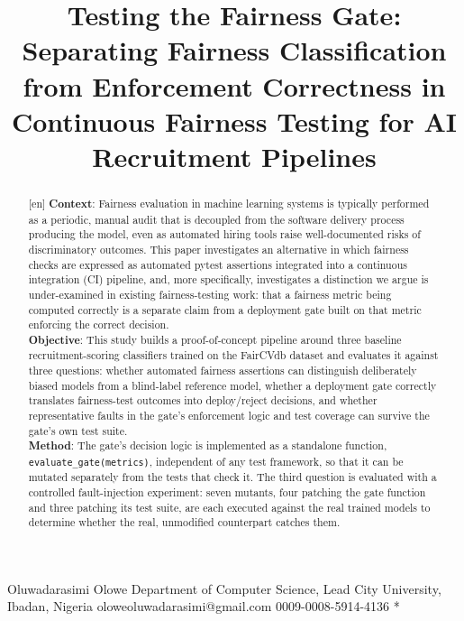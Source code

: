 \documentclass[]{einformatica}
\begin{document}
\title{Testing the Fairness Gate: Separating Fairness Classification from Enforcement Correctness in Continuous Fairness Testing for AI Recruitment Pipelines}



\eIrevised{}
\eIaccepted{}
\eIpublished{}

\EIauthorI
   {Oluwadarasimi}
   {Olowe}
   {Department of Computer Science, Lead City University, Ibadan, Nigeria}
   {oloweoluwadarasimi@gmail.com}
   {0009-0008-5914-4136}
   {*} %


\begin{abstract}[en]
\textbf{Context}:
Fairness evaluation in machine learning systems is typically performed as a periodic, manual audit that is decoupled from the software delivery process producing the model, even as automated hiring tools raise well-documented risks of discriminatory outcomes. This paper investigates an alternative in which fairness checks are expressed as automated pytest assertions integrated into a continuous integration (CI) pipeline, and, more specifically, investigates a distinction we argue is under-examined in existing fairness-testing work: that a fairness metric being computed correctly is a separate claim from a deployment gate built on that metric enforcing the correct decision. \\
\textbf{Objective}:
This study builds a proof-of-concept pipeline around three baseline recruitment-scoring classifiers trained on the FairCVdb dataset and evaluates it against three questions: whether automated fairness assertions can distinguish deliberately biased models from a blind-label reference model, whether a deployment gate correctly translates fairness-test outcomes into deploy/reject decisions, and whether representative faults in the gate's enforcement logic and test coverage can survive the gate's own test suite. \\
\textbf{Method}:
The gate's decision logic is implemented as a standalone function, \texttt{evaluate\_gate(metrics)}, independent of any test framework, so that it can be mutated separately from the tests that check it. The third question is evaluated with a controlled fault-injection experiment: seven mutants, four patching the gate function and three patching its test suite, are each executed against the real trained models to determine whether the real, unmodified counterpart catches them. \\

\end{abstract}
\end{document}
